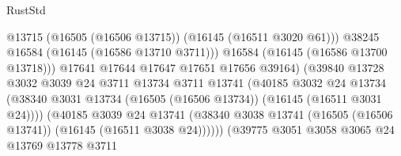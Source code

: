 \begin{lexlean}{RustStd}
\begin{coremodule}
                                                @13715
                                                (@16505 (@16506 @13715))
                                                (@16145 (@16511 @3020 @61)))
                                              @38245
                                              @16584
                                              (@16145 (@16586 @13710 @3711)))
                                            @16584
                                            (@16145 (@16586 @13700 @13718)))
                                          @17641
                                          @17644
                                          @17647
                                          @17651
                                          @17656
                                          @39164)
                                        (@39840
                                          @13728
                                          @3032
                                          @3039
                                          @24
                                          @3711
                                          @13734
                                          @3711
                                          @13741
                                          (@40185
                                            @3032
                                            @24
                                            @13734
                                            (@38340
                                              @3031
                                              @13734
                                              (@16505 (@16506 @13734))
                                              (@16145 (@16511 @3031 @24))))
                                          (@40185
                                            @3039
                                            @24
                                            @13741
                                            (@38340
                                              @3038
                                              @13741
                                              (@16505 (@16506 @13741))
                                              (@16145 (@16511 @3038 @24))))))
                                      (@39775
                                        @3051
                                        @3058
                                        @3065
                                        @24
                                        @13769
                                        @13778
                                        @3711

\end{coremodule}
\end{lexlean}
